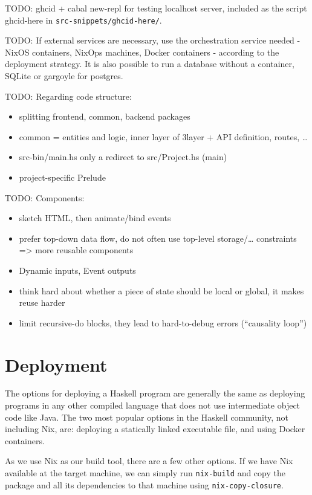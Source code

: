 \documentclass[english,odsaz]{fitthesis}
\begin{document}
TODO: ghcid + cabal new-repl for testing localhost server, included as the
script ghcid-here in \texttt{src-snippets/ghcid-here/}.

TODO: If external services are necessary, use the orchestration service needed -
NixOS containers, NixOps machines, Docker containers - according to the
deployment strategy. It is also possible to run a database without a container,
SQLite or gargoyle for postgres.

TODO: Regarding code structure:
\begin{itemize}
\item splitting frontend, common, backend packages
\item common = entities and logic, inner layer of 3layer + API definition, routes, \ldots{}
\item src-bin/main.hs only a redirect to src/Project.hs (main)
\item project-specific Prelude
\end{itemize}

TODO: Components:
\begin{itemize}
\item sketch HTML, then animate/bind events
\item prefer top-down data flow, do not often use top-level storage/\ldots{} constraints
=> more reusable components
\item Dynamic inputs, Event outputs
\item think hard about whether a piece of state should be local or global, it makes
reuse harder
\item limit recursive-do blocks, they lead to hard-to-debug errors (``causality loop'')
\end{itemize}

\section{Deployment}
\label{sec:org0799bdc}
The options for deploying a Haskell program are generally the same as deploying
programs in any other compiled language that does not use intermediate object
code like Java. The two most popular options in the Haskell community, not
including Nix, are: deploying a statically linked executable file, and using
Docker containers.

As we use Nix as our build tool, there are a few other options. If we have Nix
available at the target machine, we can simply run \texttt{nix-build} and copy the
package and all its dependencies to that machine using \texttt{nix-copy-closure}.
\end{document}
